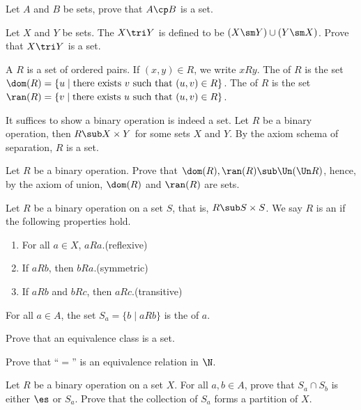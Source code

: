 \documentclass[10pt]{article}
\begin{document}
\begin{problem}
    Let $A$ and $B$ be sets, prove that $A\cp B$ is a set.
\end{problem}
\begin{problem}
    Let $X$ and $Y$ be sets. The  $X\tri Y$ is defined to be $(X\sm Y)\cup(Y\sm X)$. Prove that $X\tri Y$ is a set.
\end{problem}
\begin{definition}
    A  $R$ is a set of ordered pairs. If $(x,y)\in R$, we write $xRy$. The  of $R$ is the set $\dom(R)=\{u\mid\text{there exists}\ v\ \text{such that}\ (u,v)\in R\}$. The  of $R$ is the set $\ran(R)=\{v\mid\text{there exists}\ u\ \text{such that}\ (u,v)\in R\}$. 
\end{definition}
\par
It suffices to show a binary operation is indeed a set. Let $R$ be a binary operation, then $R\sub X\times Y$ for some sets $X$ and $Y$. By the axiom schema of separation, $R$ is a set. 
\begin{problem}
    Let $R$ be a binary operation. Prove that $\dom(R),\ran(R)\sub\Un(\Un R)$, hence, by the axiom of union, $\dom(R)$ and $\ran(R)$ are sets.
\end{problem}
\begin{definition}
    Let $R$ be a binary operation on a set $S$, that is, $R\sub S\times S$. We say $R$ is an  if the following properties hold.
    \begin{enumerate}
        \item For all $a\in X$, $aRa$.\hfill(reflexive)
        \item If $aRb$, then $bRa$.\hfill(symmetric)
        \item If $aRb$ and $bRc$, then $aRc$.\hfill(transitive)
    \end{enumerate}
    For all $a\in A$, the set ${S}_{a}=\{b\mid aRb\}$ is the  of $a$. 
\end{definition}
\begin{problem}
    Prove that an equivalence class is a set.
\end{problem}
\begin{problem}
    Prove that ``$=$'' is an equivalence relation in $\N$.
\end{problem}
\begin{problem}
    Let $R$ be a binary operation on a set $X$. For all $a,b\in A$, prove that ${S}_{a}\cap{S}_{b}$ is either $\es$ or ${S}_{a}$. Prove that the collection of ${S}_{a}$ forms a partition of $X$.
\end{problem}
\end{document}

